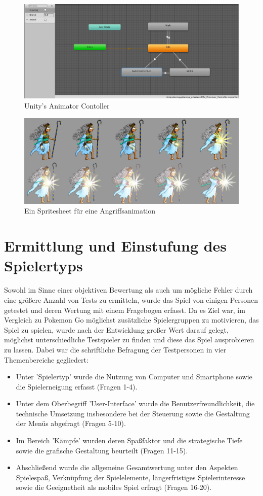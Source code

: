 \documentclass[extern,palatino]{cgBA}
\begin{document}
\begin{figure}[H]
	\centering
	\includegraphics[width=1\textwidth]{animator.jpg}
	\caption{Unity's Animator Contoller}
\end{figure}
\begin{figure}[H]
	\centering
	\includegraphics[width=1\textwidth]{attack.jpg}
	\caption{Ein Spritesheet für eine Angriffsanimation}
\end{figure}

\section{Ermittlung und Einstufung des Spielertyps}\label{sur}	Sowohl im Sinne einer objektiven Bewertung als auch um mögliche Fehler durch eine größere Anzahl von Tests zu ermitteln, wurde das Spiel von einigen Personen getestet und deren Wertung mit einem Fragebogen erfasst. Da es Ziel war, im Vergleich zu Pokemon Go möglichst zusätzliche Spielergruppen zu motivieren, das Spiel zu spielen, wurde nach der Entwicklung großer Wert darauf gelegt, möglichst unterschiedliche Testspieler zu finden und diese das Spiel ausprobieren zu lassen. Dabei war die schriftliche Befragung der Testpersonen in vier Themenbereiche gegliedert:
\begin{itemize}
	\item Unter 'Spielertyp' wurde die Nutzung von Computer und Smartphone sowie die Spielerneigung erfasst (Fragen 1-4). 
	\item Unter dem Oberbegriff 'User-Interface' wurde die Benutzerfreundlichkeit, die technische Umsetzung insbesondere bei der Steuerung sowie die Gestaltung der Menüs abgefragt (Fragen 5-10).
	\item Im Bereich 'Kämpfe' wurden deren Spaßfaktor und die strategische Tiefe sowie die grafische Gestaltung beurteilt (Fragen 11-15).
	\item Abschließend wurde die allgemeine Gesamtwertung unter den Aspekten Spielespaß, Verknüpfung der Spielelemente, längerfristiges Spielerinteresse sowie die Geeignetheit als mobiles Spiel erfragt (Fragen 16-20).
\end{itemize}
\end{document}
